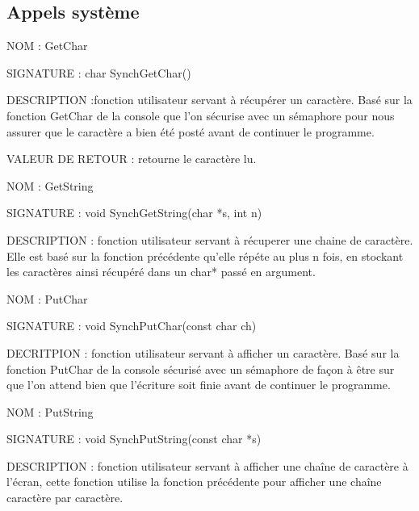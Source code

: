 \documentclass{article}
\begin{document}
	\subsection{Appels système}
	\begin{description}
		\item{NOM :} GetChar
		\item{SIGNATURE : } char SynchGetChar()
		\item{DESCRIPTION :}{fonction utilisateur servant à récupérer un caractère. Basé sur la fonction GetChar de la console que l'on sécurise avec un sémaphore pour nous assurer que le caractère a bien été posté avant de continuer le programme.}
		\item{VALEUR DE RETOUR : } retourne le caractère lu.
	\end{description}
	\begin{description}
		\item{NOM : } GetString
		\item{SIGNATURE : } void SynchGetString(char *s, int n)
		\item{DESCRIPTION : } fonction utilisateur servant à récuperer une chaine de caractère. Elle est basé sur la fonction précédente qu'elle répéte au plus n fois, en stockant les caractères ainsi récupéré dans un char* passé en argument.
	\end{description}
	\begin{description}
		\item{NOM : } PutChar
		\item{SIGNATURE : } void SynchPutChar(const char ch)
		\item{DECRITPION : } fonction utilisateur servant à afficher un caractère. Basé sur la fonction PutChar de la console sécurisé avec un sémaphore de façon à être sur que l'on attend bien que l'écriture soit finie avant de continuer le programme.
	\end{description}
	\begin{description}
		\item{NOM : } PutString
		\item{SIGNATURE : } void SynchPutString(const char *s)
		\item{DESCRIPTION : } fonction utilisateur servant à afficher une chaîne de caractère à l'écran, cette fonction utilise la fonction précédente pour afficher une chaîne caractère par caractère.
	\end{description}
\end{document}
